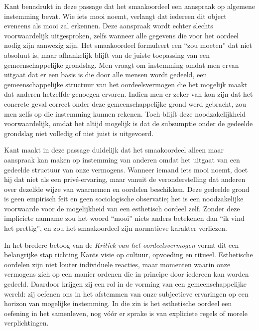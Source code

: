 \begin{mdframed}[leftmargin=0pt,rightmargin=0pt,backgroundcolor=blue!6,linecolor=white,innertopmargin=6pt,innerbottommargin=6pt]
Kant benadrukt in deze passage dat het smaakoordeel een aanspraak op algemene instemming bevat. Wie iets mooi noemt, verlangt dat iedereen dit object eveneens als mooi zal erkennen. Deze aanspraak wordt echter slechts voorwaardelijk uitgesproken, zelfs wanneer alle gegevens die voor het oordeel nodig zijn aanwezig zijn. Het smaakoordeel formuleert een “zou moeten” dat niet absoluut is, maar afhankelijk blijft van de juiste toepassing van een gemeenschappelijke grondslag. Men vraagt om instemming omdat men ervan uitgaat dat er een basis is die door alle mensen wordt gedeeld, een gemeenschappelijke structuur van het oordeelsvermogen die het mogelijk maakt dat anderen hetzelfde genoegen ervaren. Indien men er zeker van kon zijn dat het concrete geval correct onder deze gemeenschappelijke grond werd gebracht, zou men zelfs op die instemming kunnen rekenen. Toch blijft deze noodzakelijkheid voorwaardelijk, omdat het altijd mogelijk is dat de subsumptie onder de gedeelde grondslag niet volledig of niet juist is uitgevoerd.

\bigskip
Kant maakt in deze passage duidelijk dat het smaakoordeel alleen maar aanspraak kan maken op instemming van anderen omdat het uitgaat van een gedeelde structuur van onze vermogens. Wanneer iemand iets mooi noemt, doet hij dat niet als een privé-ervaring, maar vanuit de veronderstelling dat anderen over dezelfde wijze van waarnemen en oordelen beschikken. Deze gedeelde grond is geen empirisch feit en geen sociologische observatie; het is een noodzakelijke voorwaarde voor de mogelijkheid van een esthetisch oordeel zelf. Zonder deze impliciete aanname zou het woord “mooi” niets anders betekenen dan “ik vind het prettig”, en zou het smaakoordeel zijn normatieve karakter verliezen.

In het bredere betoog van de \emph{Kritiek van het oordeelsvermogen} vormt dit een belangrijke stap richting Kants visie op cultuur, opvoeding en ritueel. Esthetische oordelen zijn niet louter individuele reacties, maar momenten waarin onze vermogens zich op een manier ordenen die in principe door iedereen kan worden gedeeld. Daardoor krijgen zij een rol in de vorming van een gemeenschappelijke wereld: zij oefenen ons in het afstemmen van onze subjectieve ervaringen op een horizon van mogelijke instemming. In die zin is het esthetische oordeel een oefening in het samenleven, nog vóór er sprake is van expliciete regels of morele verplichtingen.


\end{mdframed}
